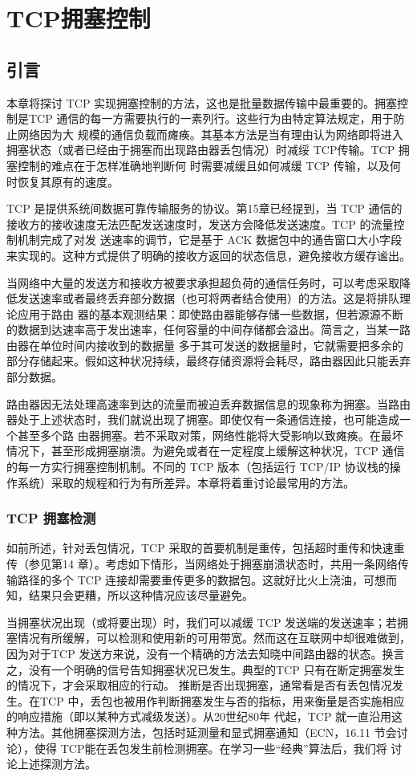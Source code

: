 \chapter{TCP拥塞控制}

\section{引言}
本章将探讨 TCP 实现拥塞控制的方法，这也是批量数据传输中最重要的。拥塞控制是TCP 通信的每一方需要执行的一素列行。这些行为由特定算法规定，用于防止网络因为大
规模的通信负载而瘫痪。其基本方法是当有理由认为网络即将进入拥塞状态（或者已经由于拥塞而出现路由器丢包情况）时减绥 TCP传输。TCP 拥塞控制的难点在于怎样准确地判断何
时需要减缓且如何减缓 TCP 传输，以及何时恢复其原有的速度。

TCP 是提供系统间数据可靠传输服务的协议。第15章已经提到，当 TCP 通信的接收方的接收速度无法匹配发送速度时，发送方会降低发送速度。TCP 的流量控制机制完成了对发
送速率的调节，它是基于 ACK 数据包中的通告窗口大小字段来实现的。这种方式提供了明确的接收方返回的状态信息，避免接收方缓存谧出。

当网络中大量的发送方和接收方被要求承担超负荷的通信任务时，可以考虑采取降低发送速率或者最终丢弃部分数据（也可将两者结合使用）的方法。这是将排队理论应用于路由
器的基本观测结果：即使路由器能够存储一些数据，但若源源不断的数据到达速率高于发出速率，任何容量的中间存储都会溢出。简言之，当某一路由器在单位时间内接收到的数据量
多于其可发送的数据量时，它就需要把多余的部分存储起来。假如这种状况持续，最终存储资源将会耗尽，路由器因此只能丢弃部分数据。

路由器因无法处理高速率到达的流量而被迫丢弃数据信息的现象称为拥塞。当路由器处于上述状态时，我们就说出现了拥塞。即使仅有一条通信连接，也可能造成一个甚至多个路
由器拥塞。若不采取对策，网络性能将大受影响以致瘫痪。在最坏情况下，甚至形成拥塞崩溃。为避免或者在一定程度上缓解这种状况，TCP 通信的每一方实行拥塞控制机制。不同的
TCP 版本（包括运行 TCP/IP 协议栈的操作系统）采取的规程和行为有所差异。本章将着重讨论最常用的方法。
\subsection{TCP 拥塞检测}
如前所述，针对丢包情况，TCP 采取的首要机制是重传，包括超时重传和快速重传（参见第14 章）。考虑如下情形，当网络处于拥塞崩溃状态时，共用一条网络传输路径的多个
TCP 连接却需要重传更多的数据包。这就好比火上浇油，可想而知，结果只会更糟，所以这种情况应该尽量避免。

当拥塞状况出现（或将要出现）时，我们可以减缓 TCP 发送端的发送速率；若拥塞情况有所缓解，可以检测和使用新的可用带宽。然而这在互联网中却很难做到，因为对于TCP
发送方来说，没有一个精确的方法去知晓中间路由器的状态。换言之，没有一个明确的信号告知拥塞状况已发生。典型的TCP 只有在断定拥塞发生的情况下，才会采取相应的行动。
推断是否出现拥塞，通常看是否有丢包情况发生。在TCP 中，丢包也被用作判断拥塞发生与否的指标，用来衡量是否实施相应的响应措施（即以某种方式减级发送）。从20世纪80年
代起，TCP 就一直沿用这种方法。其他拥塞探测方法，包括时延测量和显式拥塞通知（ECN，16.11 节会讨论），使得 TCP能在丢包发生前检测拥塞。在学习一些“经典”算法后，我们将
讨论上述探测方法。

